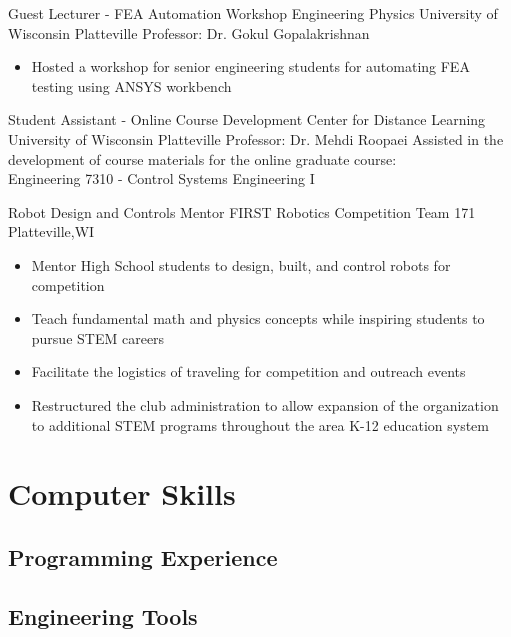 \documentclass[11pt,letterpaper,roman]{moderncv} %
\begin{document}
{Guest Lecturer - FEA Automation Workshop}
{Engineering Physics}
{University of Wisconsin Platteville}
{Professor: Dr. Gokul Gopalakrishnan}
{\begin{itemize}
    \item Hosted a workshop for senior engineering students for automating FEA testing using ANSYS workbench
\end{itemize}
}

{Student Assistant - Online Course Development}
{Center for Distance Learning}
{University of Wisconsin Platteville}
{Professor: Dr. Mehdi Roopaei}
{Assisted in the development of course materials for the online graduate course:\\ Engineering 7310 - Control Systems Engineering I}


{Robot Design and Controls Mentor}
{FIRST Robotics Competition Team 171}
{Platteville,WI}{}{
\begin{itemize}
    \item Mentor High School students to design, built, and control robots for competition
    \item Teach fundamental math and physics concepts while inspiring students to pursue STEM careers
    \item Facilitate the logistics of traveling for competition and outreach events
    \item Restructured the club administration to allow expansion of the organization to additional STEM programs throughout the area K-12 education system
\end{itemize}
}

\section{Computer Skills}

\subsection{\textbf{Programming Experience}}

\subsection{\textbf{Engineering Tools}}
\end{document}

